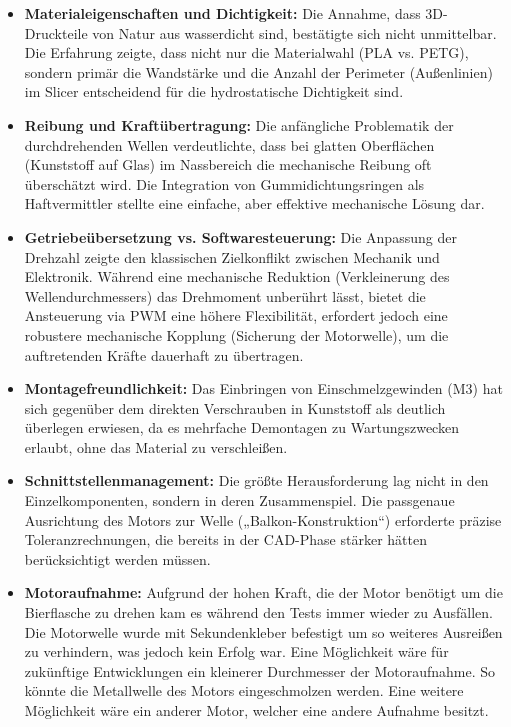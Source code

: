 \begin{itemize}
	\item \textbf{Materialeigenschaften und Dichtigkeit:} Die Annahme, dass 3D-Druckteile von Natur aus wasserdicht sind, bestätigte sich nicht unmittelbar. Die Erfahrung zeigte, dass nicht nur die Materialwahl (PLA vs. PETG), sondern primär die Wandstärke und die Anzahl der Perimeter (Außenlinien) im Slicer entscheidend für die hydrostatische Dichtigkeit sind.
	\item \textbf{Reibung und Kraftübertragung:} Die anfängliche Problematik der durchdrehenden Wellen verdeutlichte, dass bei glatten Oberflächen (Kunststoff auf Glas) im Nassbereich die mechanische Reibung oft überschätzt wird. Die Integration von Gummidichtungsringen als Haftvermittler stellte eine einfache, aber effektive mechanische Lösung dar.
	\item \textbf{Getriebeübersetzung vs. Softwaresteuerung:} Die Anpassung der Drehzahl zeigte den klassischen Zielkonflikt zwischen Mechanik und Elektronik. Während eine mechanische Reduktion (Verkleinerung des Wellendurchmessers) das Drehmoment unberührt lässt, bietet die Ansteuerung via PWM eine höhere Flexibilität, erfordert jedoch eine robustere mechanische Kopplung (Sicherung der Motorwelle), um die auftretenden Kräfte dauerhaft zu übertragen.
	\item \textbf{Montagefreundlichkeit:} Das Einbringen von Einschmelzgewinden (M3) hat sich gegenüber dem direkten Verschrauben in Kunststoff als deutlich überlegen erwiesen, da es mehrfache Demontagen zu Wartungszwecken erlaubt, ohne das Material zu verschleißen.
	\item \textbf{Schnittstellenmanagement:} Die größte Herausforderung lag nicht in den Einzelkomponenten, sondern in deren Zusammenspiel. Die passgenaue Ausrichtung des Motors zur Welle („Balkon-Konstruktion“) erforderte präzise Toleranzrechnungen, die bereits in der CAD-Phase stärker hätten berücksichtigt werden müssen.
	\item \textbf{Motoraufnahme:} Aufgrund der hohen Kraft, die der Motor benötigt um die Bierflasche zu drehen kam es während den Tests immer wieder zu Ausfällen. Die Motorwelle wurde mit Sekundenkleber befestigt um so weiteres Ausreißen zu verhindern, was jedoch kein Erfolg war. Eine Möglichkeit wäre für zukünftige Entwicklungen ein kleinerer Durchmesser der Motoraufnahme. So könnte die Metallwelle des Motors eingeschmolzen werden. Eine weitere Möglichkeit wäre ein anderer Motor, welcher eine andere Aufnahme besitzt.
\end{itemize}
